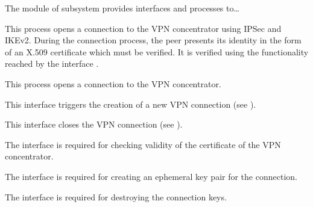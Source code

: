 


The module  of subsystem  provides interfaces and processes to…



This process opens a connection to the VPN concentrator using IPSec and
IKEv2. During the connection process, the peer presents its identity in the form
of an X.509 certificate which must be verified. It is verified using the
functionality reached by the interface .



This process opens a connection to the VPN concentrator.





This interface triggers the creation of a new VPN connection (see ).


This interface closes the VPN connection (see ).


The interface  is required for checking
validity of the certificate of the VPN concentrator.


The interface  is required for
creating an ephemeral key pair for the connection.


The interface  is required for
destroying the connection keys.


